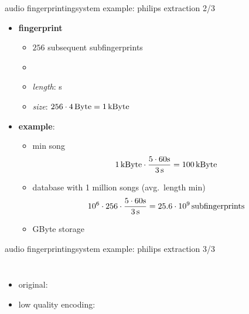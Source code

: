         \begin{frame}{audio fingerprinting}{system example: philips extraction 2/3}
            \begin{itemize}
                \item[] \textbf{fingerprint}
                    \begin{itemize}
                        \item	$256$ subsequent subfingerprints
                        \item<2->[$\Rightarrow$]
                        \item<2->	\textit{length}: \unit[3]{s}
                        \item<2->	\textit{size}: $256\cdot \unit[4]{Byte} = \unit[1]{kByte}$
                    \end{itemize}
                \smallskip
                \item<3->[]   \textbf{example}:
                    \begin{itemize}
                        \item   \unit[5]{min} song
                        \begin{equation*}
                            \unit[1]{kByte} \cdot \frac{5\cdot 60 \unit{s}}{\unit[3]{s}} = \unit[100]{kByte}
                        \end{equation*}
                    \end{itemize}
                    
                    \begin{itemize}
                        \item<4->   database with 1 million songs (avg.\ length \unit[5]{min})
                        \begin{equation*}
                            10^6\cdot 256\cdot\frac{5\cdot 60 \unit{s}}{\unit[3]{s}} = \unit[25.6\cdot 10^9]{subfingerprints}
                        \end{equation*}
                        \item<4->[$\Rightarrow$] \unit[100]{GByte} storage
                    \end{itemize}
            \end{itemize}
        \end{frame}
        
        \begin{frame}{audio fingerprinting}{system example: philips extraction 3/3}
            \begin{columns}
                \begin{itemize}
                    \item   original: 
                    \item   low quality encoding: 
                \end{itemize}
                \vspace{-5mm}
            \end{columns}
        \end{frame}
        
